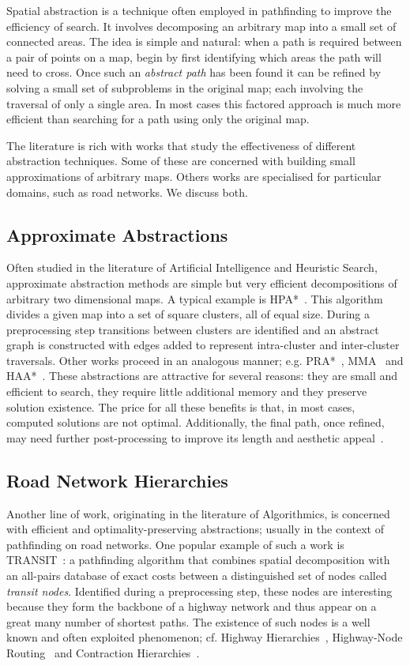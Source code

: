 \label{cha::lit::abstraction}
Spatial abstraction is a technique often employed in pathfinding to improve
the efficiency of search. It involves decomposing an arbitrary map into a
small set of connected areas. The idea is simple and natural: when a path is
required between a pair of points on a map, begin by first identifying which
areas the path will need to cross. Once such an \emph{abstract path} has been
found it can be refined by solving a small set of subproblems in the original
map; each involving the traversal of only a single area. In most cases this
factored approach is much more efficient than searching for a path using only
the original map.

The literature is rich with works that study the effectiveness of different
abstraction techniques.  Some of these are concerned with building small
approximations of arbitrary maps.  Others works are specialised for particular
domains, such as road networks. We discuss both.

\subsection{Approximate Abstractions}
Often studied in the literature of Artificial Intelligence and Heuristic
Search, approximate abstraction methods are simple but very efficient
decompositions of arbitrary two dimensional maps.  A typical example is
HPA*~\citep{botea04}. This algorithm divides a given map into a set of square
clusters, all of equal size. During a preprocessing step transitions between
clusters are identified and an abstract graph is constructed with edges added
to represent intra-cluster and inter-cluster traversals.  Other works proceed
in an analogous manner; e.g. PRA*~\citep{sturtevant05},
MMA~\citep{sturtevant07} and HAA*~\citep{harabor08}.  These abstractions are
attractive for several reasons: they are small and efficient to search, they
require little additional memory and they preserve solution existence.  The
price for all these benefits is that, in most cases, computed solutions are
not optimal. Additionally, the final path, once refined, may need further
post-processing to improve its length and aesthetic
appeal~\citep{pinter01,botea04}.

\subsection{Road Network Hierarchies}
Another line of work, originating in the literature of Algorithmics, is
concerned with efficient and optimality-preserving abstractions; usually in
the context of pathfinding on road networks.  One popular example of such a
work is TRANSIT~\citep{bast06,bast07}: a pathfinding algorithm that combines
spatial decomposition with an all-pairs database of exact costs between a
distinguished set of nodes called \emph{transit nodes}. Identified during a
preprocessing step, these nodes are interesting because they form the backbone
of a highway network and thus appear on a great many number of shortest paths.
The existence of such nodes is a well known and often exploited phenomenon;
cf. Highway Hierarchies~\citep{sanders05,sanders06}, Highway-Node
Routing~\citep{schultes07} and Contraction Hierarchies~\citep{geisberger08}.

